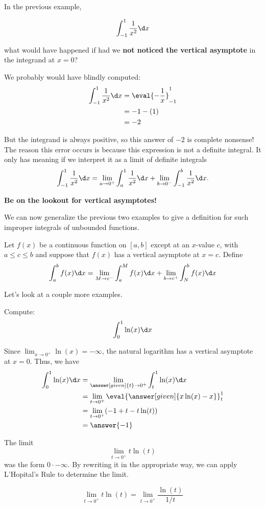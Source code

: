 \documentclass{ximera}
\begin{document}
\begin{warning}
In the previous example,

\[
\int_{-1}^{1} \frac{1}{x^2} \d x
\]

 what would have happened if had we \textbf{not
  noticed the vertical asymptote} in the integrand at $x=0$?

We probably would have blindly computed:
\begin{align*}
  \int_{-1}^1\frac1{x^2}\d x &= \eval{-\frac{1}{x}}_{-1}^1\\
  &= -1 - (1)\\
  &=-2
\end{align*}

But the integrand is always positive, so this answer of $-2$ is
complete nonsense! The reason this error occurs is because this expression is not a definite integral. It only has meaning if we
interpret it as a limit of definite integrals 
\[
 \int_{-1}^1 \frac{1}{x^2} \d x = \lim_{a \to 0^+} \int_{a}^1 \frac{1}{x^2} \d x  + \lim_{b \to 0^-} \int_{-1}^{b} \frac{1}{x^2} \d x.
\]


\textbf{Be on the lookout for vertical asymptotes!}
\end{warning}


We can now generalize the previous two examples to give a definition for such 
improper integrals of unbounded functions.

\begin{definition}
Let $f(x)$ be a continuous function on $[a,b]$ except at an $x$-value $c$, with $a\leq
c\leq b$ and suppose that $f(x)$ has a vertical asymptote at $x=c$. Define
\[
\int_a^b f(x)\d x = \lim_{M\to c^-}\int_a^M f(x)\d x + \lim_{b\to c^+}\int_N^b f(x)\d x
\]
\end{definition}

Let's look at a couple more examples. 


\begin{example}
  Compute:
  \[
  \int_0^1 \ln(x)\d x
  \]
  \begin{explanation}
    Since $\lim_{x\to 0^+} \ln(x) = -\infty$, the natural logarithm
    has a vertical asymptote at $x = 0$. Thus, we have
    \begin{align*}
    \int_0^1 \ln(x) \d x &=\lim_{\answer[given]{t}\to 0^+} \int_t^1 \ln(x) \d x \\
    &= \lim_{t\to 0^+} \eval{\answer[given]{x \ln(x)-x}}_t^1 \\
    &=\lim_{t \to 0^{+}} ( -1 + t - t\ln(t) ) \\
&=\answer{ -1} 
      \end{align*}
\begin{hint}
The limit 
\[
\lim_{t \to 0^{+}} t\ln(t)
\]
was the form $0\cdot -\infty$. By rewriting it in the appropriate way, we can apply L'Hopital's Rule to 
determine the limit. 

\[
\lim_{t \to 0^{+}} t\ln(t) =\lim_{t \to 0^{+}} \frac{\ln(t)}{1/t}
\]
\end{hint}
  \end{explanation}
\end{example}
\end{document}
